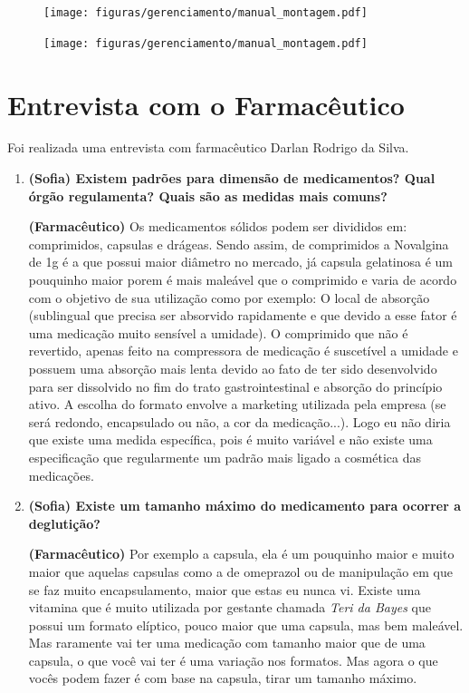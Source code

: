 \begin{apendicesenv}
\begin{figure}[H]
    \centering
    \texttt{[image: figuras/gerenciamento/manual\_montagem.pdf]}
    \label{fig:manual_montagem_24}
\end{figure}

\begin{figure}[H]
    \centering
    \texttt{[image: figuras/gerenciamento/manual\_montagem.pdf]}
    \label{fig:manual_usuario_25}
\end{figure}

\chapter{Entrevista com o Farmacêutico}\label{entrevista_app}

Foi realizada uma entrevista com farmacêutico Darlan Rodrigo da Silva.

\begin{enumerate}
\item \textbf{(Sofia) Existem padrões para dimensão de medicamentos? Qual órgão regulamenta? Quais são as medidas mais comuns?}

\textbf{(Farmacêutico)} Os medicamentos sólidos podem ser divididos em: comprimidos, capsulas e drágeas. Sendo assim, de comprimidos a Novalgina de 1g é a que possui maior diâmetro no mercado, já capsula gelatinosa é um pouquinho maior porem é mais maleável que o comprimido e varia de acordo com o objetivo de sua utilização como por exemplo: O local de absorção (sublingual que precisa ser absorvido rapidamente e que devido a esse fator é uma medicação muito sensível a umidade). O comprimido que não é revertido, apenas feito na compressora de medicação é suscetível a umidade e possuem uma absorção mais lenta devido ao fato de ter sido desenvolvido para ser dissolvido no fim do trato gastrointestinal e absorção do princípio ativo. A escolha do formato envolve a marketing utilizada pela empresa (se será redondo, encapsulado ou não, a cor da medicação...). Logo eu não diria que existe uma medida específica, pois é muito variável e não existe uma especificação que regularmente um padrão mais ligado a cosmética das medicações.

\item \textbf{(Sofia) Existe um tamanho máximo do medicamento para ocorrer a deglutição?}

\textbf{(Farmacêutico)} Por exemplo a capsula, ela é um pouquinho maior e muito maior que aquelas capsulas como a de omeprazol ou de manipulação em que se faz muito encapsulamento, maior que estas eu nunca vi. Existe uma vitamina que é muito utilizada por gestante chamada \textit{Teri da Bayes} que possui um formato elíptico, pouco maior que uma capsula, mas bem maleável. Mas raramente vai ter uma medicação com tamanho maior que de uma capsula, o que você vai ter é uma variação nos formatos. Mas agora o que vocês podem fazer é com base na capsula, tirar um tamanho máximo.


\end{enumerate}
\end{apendicesenv}
